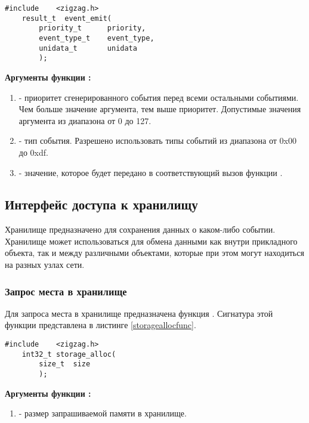 \begin{lstlisting}[caption=Функция \myfunc{event\_emit()} - генерация события., label=eventemitfunc ]
    #include    <zigzag.h>
    result_t  event_emit(
        priority_t      priority,
        event_type_t    event_type,
        unidata_t       unidata
        );
\end{lstlisting}

{\bfseries Аргументы функции :}

{\itshape
\begin{enumerate}
\item {} - приоритет сгенерированного события перед всеми остальными событиями. Чем больше значение аргумента, тем выше
приоритет. Допустимые значения аргумента из диапазона от 0 до 127.
\item {} - тип события. Разрешено использовать типы событий из диапазона от 0x00 до 0xdf.
\item {} - значение, которое будет передано в соответствующий вызов функции .
\end{enumerate}
}

\subsection{Интерфейс доступа к хранилищу}
Хранилище предназначено для сохранения данных о каком-либо событии. Хранилище может использоваться для
обмена данными как внутри прикладного объекта, так и между различными объектами, которые при этом могут находиться
на разных узлах сети. 

\subsubsection{Запрос места в хранилище}

Для запроса места в хранилище предназначена функция . Сигнатура этой функции 
представлена в листинге \ref{storageallocfunc}.

\begin{lstlisting}[caption=Функция \myfunc{storage\_alloc()} - запрос места в хранилище, label=storageallocfunc]
    #include    <zigzag.h>
    int32_t storage_alloc(
        size_t  size
        );
\end{lstlisting}

{\bfseries Аргументы функции :}

{\itshape
\begin{enumerate} 
\item {} - размер запрашиваемой памяти в хранилище.
\end{enumerate}
}

